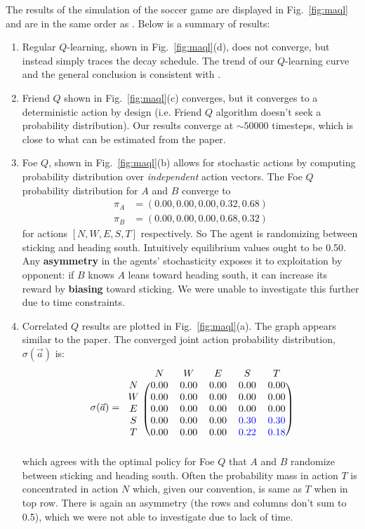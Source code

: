 \documentclass[conference]{IEEEtran}
\begin{document}
The results of the simulation of the soccer game are displayed in Fig.~\ref{fig:maql} and are in the same order as \cite{greenwald}. Below is a summary of results:
%
\begin{enumerate}
\item Regular $Q$-learning, shown in Fig.~\ref{fig:maql}(d), does not converge, but instead simply traces the decay schedule. The trend of our $Q$-learning curve and the general conclusion is consistent with \cite{greenwald}.
%
\item Friend $Q$ shown in Fig.~\ref{fig:maql}(c) converges, but it converges to a deterministic action  by design (i.e. Friend $Q$ algorithm doesn't seek a probability distribution). Our results converge at $\sim50000$ timesteps, which is close to what can be estimated from the paper. 
%
\item Foe $Q$, shown in Fig.~\ref{fig:maql}(b) allows for stochastic actions by computing probability distribution over {\em independent} action vectors. The Foe $Q$ probability distribution for $A$ and $B$ converge to
%
\begin{align*}
\pi_A &= (0.00, 0.00, 0.00, 0.32, 0.68)\\
\pi_B &= (0.00, 0.00, 0.00, 0.68, 0.32)
\end{align*}
%
for actions $[N, W, E, S, T]$ respectively. So The agent is randomizing between sticking and heading south. Intuitively equilibrium values ought to be 0.50. Any {\bf asymmetry} in the agents' stochasticity exposes it to exploitation by opponent: if $B$ knows $A$ leans toward heading south, it can increase its reward by {\bf biasing} toward sticking. We were unable to investigate this further due to time constraints.
%
\item Correlated $Q$ results are plotted in Fig.~\ref{fig:maql}(a). The graph appears similar to the paper. The converged joint action probability distribution, $\sigma(\vec{a})$ is:
\begin{equation*}
\sigma(\vec{a}) = 
\begin{blockarray}{cccccc}
&N & W & E & S & T \\
\begin{block}{c(ccccc)}
  N & 0.00 & 0.00 & 0.00 & 0.00 & 0.00 \\
  W & 0.00 & 0.00 & 0.00 & 0.00 & 0.00 \\
  E & 0.00 & 0.00 & 0.00 & 0.00 & 0.00 \\
  S & 0.00 & 0.00 & 0.00 & {\color{blue}0.30} & {\color{blue}0.30} \\
  T & 0.00 & 0.00 & 0.00 & {\color{blue}0.22} & {\color{blue}0.18}\\
\end{block}
\end{blockarray}
\end{equation*}
which agrees with the optimal policy for Foe $Q$ that $A$ and $B$ randomize between sticking and heading south. Often the probability mass in action $T$ is concentrated in action $N$ which, given our convention, is same as $T$ when in top row. There is again an asymmetry (the rows and columns don't sum to 0.5), which we were not able to investigate due to lack of time.
\end{enumerate}
\end{document}
